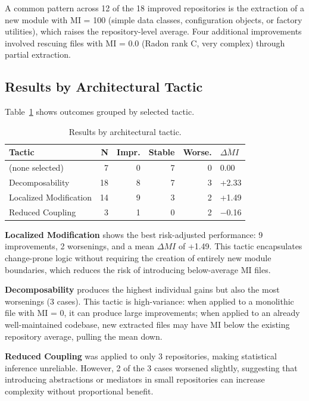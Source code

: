 \documentclass[sigconf,review,anonymous]{acmart}
\begin{document}
A common pattern across 12 of the 18 improved repositories is the extraction of a new module with MI = 100 (simple data classes, configuration objects, or factory utilities), which raises the repository-level average. Four additional improvements involved rescuing files with MI = 0.0 (Radon rank C, very complex) through partial extraction.

\subsection{Results by Architectural Tactic}

Table~\ref{tab:exp5_tactics} shows outcomes grouped by selected tactic.

\begin{table}[H]
\centering
\small
\caption{Results by architectural tactic.}
\label{tab:exp5_tactics}
\begin{tabular}{lrrrrl}
\toprule
\textbf{Tactic} & \textbf{N} & \textbf{Impr.} & \textbf{Stable} & \textbf{Worse.} & $\overline{\Delta MI}$ \\
\midrule
(none selected)       & 7  & 0 & 7 & 0 & 0.00  \\
Decomposability       & 18 & 8 & 7 & 3 & +2.33 \\
Localized Modification & 14 & 9 & 3 & 2 & +1.49 \\
Reduced Coupling      & 3  & 1 & 0 & 2 & $-$0.16 \\
\bottomrule
\end{tabular}
\end{table}

\textbf{Localized Modification} shows the best risk-adjusted performance: 9 improvements, 2 worsenings, and a mean $\Delta MI$ of +1.49. This tactic encapsulates change-prone logic without requiring the creation of entirely new module boundaries, which reduces the risk of introducing below-average MI files.

\textbf{Decomposability} produces the highest individual gains but also the most worsenings (3 cases). This tactic is high-variance: when applied to a monolithic file with MI = 0, it can produce large improvements; when applied to an already well-maintained codebase, new extracted files may have MI below the existing repository average, pulling the mean down.

\textbf{Reduced Coupling} was applied to only 3 repositories, making statistical inference unreliable. However, 2 of the 3 cases worsened slightly, suggesting that introducing abstractions or mediators in small repositories can increase complexity without proportional benefit.
\end{document}
